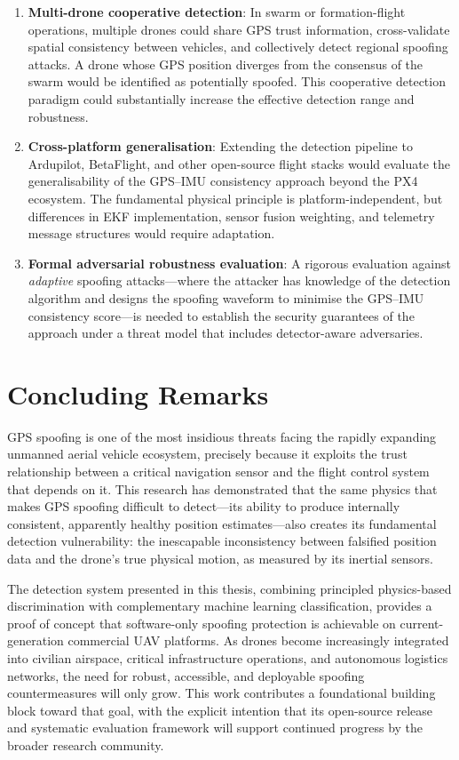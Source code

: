 \begin{enumerate}
    \item \textbf{Multi-drone cooperative detection}: In swarm or formation-flight operations, multiple drones could share GPS trust information, cross-validate spatial consistency between vehicles, and collectively detect regional spoofing attacks. A drone whose GPS position diverges from the consensus of the swarm would be identified as potentially spoofed. This cooperative detection paradigm could substantially increase the effective detection range and robustness.
    \item \textbf{Cross-platform generalisation}: Extending the detection pipeline to Ardupilot, BetaFlight, and other open-source flight stacks would evaluate the generalisability of the GPS--IMU consistency approach beyond the PX4 ecosystem. The fundamental physical principle is platform-independent, but differences in EKF implementation, sensor fusion weighting, and telemetry message structures would require adaptation.
    \item \textbf{Formal adversarial robustness evaluation}: A rigorous evaluation against \textit{adaptive} spoofing attacks---where the attacker has knowledge of the detection algorithm and designs the spoofing waveform to minimise the GPS--IMU consistency score---is needed to establish the security guarantees of the approach under a threat model that includes detector-aware adversaries.
\end{enumerate}

\section{Concluding Remarks}

GPS spoofing is one of the most insidious threats facing the rapidly expanding unmanned aerial vehicle ecosystem, precisely because it exploits the trust relationship between a critical navigation sensor and the flight control system that depends on it. This research has demonstrated that the same physics that makes GPS spoofing difficult to detect---its ability to produce internally consistent, apparently healthy position estimates---also creates its fundamental detection vulnerability: the inescapable inconsistency between falsified position data and the drone's true physical motion, as measured by its inertial sensors.

The detection system presented in this thesis, combining principled physics-based discrimination with complementary machine learning classification, provides a proof of concept that software-only spoofing protection is achievable on current-generation commercial UAV platforms. As drones become increasingly integrated into civilian airspace, critical infrastructure operations, and autonomous logistics networks, the need for robust, accessible, and deployable spoofing countermeasures will only grow. This work contributes a foundational building block toward that goal, with the explicit intention that its open-source release and systematic evaluation framework will support continued progress by the broader research community.
